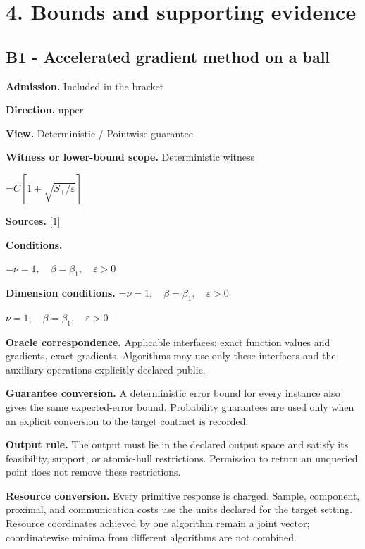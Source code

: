 \documentclass[10pt,a4paper]{article}
\newcommand{\AtlasMath}[1]{\par\begingroup\centering\setbox0=\hbox{$\displaystyle #1$}\ifdim\wd0>1.4\linewidth\typeout{ATLAS WIDE FORMULA: \the\wd0}\fi\ifdim\wd0>\linewidth\resizebox{\linewidth}{!}{\box0}\else\box0\fi\par\endgroup}
\newcommand{\AtlasInlineMath}[1]{\begingroup\setbox0=\hbox{$#1$}\ifdim\wd0>.4\linewidth\endgroup\AtlasMath{#1}\else\endgroup$#1$\fi}
\begin{document}
\section{4. Bounds and supporting evidence}


\subsection{B1 - Accelerated gradient method on a ball}


\textbf{Admission.} Included in the bracket



\textbf{Direction.} upper



\textbf{View.} Deterministic / Pointwise guarantee



\textbf{Witness or lower-bound scope.} Deterministic witness



\AtlasMath{C[1+\sqrt{S_+/\varepsilon}]}


\textbf{Sources.} \href{https://optimization-online.org/wp-content/uploads/2010/12/2865.pdf}{[1]}



\textbf{Conditions.}
\AtlasMath{\nu=1,\quad\beta=\beta_1,\quad\varepsilon>0}




\textbf{Dimension conditions.} \AtlasInlineMath{\nu=1,\quad\beta=\beta_1,\quad\varepsilon>0}



\textbf{Oracle correspondence.} Applicable interfaces: exact function values and gradients, exact gradients. Algorithms may use only these interfaces and the auxiliary operations explicitly declared public.



\textbf{Guarantee conversion.} A deterministic error bound for every instance also gives the same expected-error bound. Probability guarantees are used only when an explicit conversion to the target contract is recorded.



\textbf{Output rule.} The output must lie in the declared output space and satisfy its feasibility, support, or atomic-hull restrictions. Permission to return an unqueried point does not remove these restrictions.



\textbf{Resource conversion.} Every primitive response is charged. Sample, component, proximal, and communication costs use the units declared for the target setting. Resource coordinates achieved by one algorithm remain a joint vector; coordinatewise minima from different algorithms are not combined.
\end{document}
